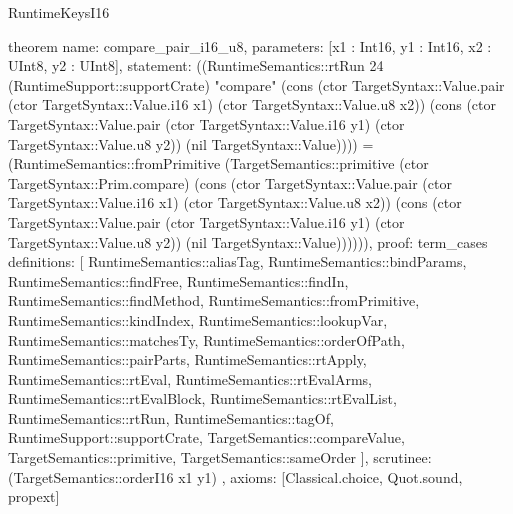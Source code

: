 \begin{lexlean}{RuntimeKeysI16}
\begin{semanticmodule}
theorem{
  name: compare_pair_i16_u8,
  parameters: [x1 : Int16, y1 : Int16, x2 : UInt8, y2 : UInt8],
  statement: ((RuntimeSemantics::rtRun 24 (RuntimeSupport::supportCrate) "compare" (cons (ctor TargetSyntax::Value.pair (ctor TargetSyntax::Value.i16 x1) (ctor TargetSyntax::Value.u8 x2)) (cons (ctor TargetSyntax::Value.pair (ctor TargetSyntax::Value.i16 y1) (ctor TargetSyntax::Value.u8 y2)) (nil TargetSyntax::Value)))) = (RuntimeSemantics::fromPrimitive (TargetSemantics::primitive (ctor TargetSyntax::Prim.compare) (cons (ctor TargetSyntax::Value.pair (ctor TargetSyntax::Value.i16 x1) (ctor TargetSyntax::Value.u8 x2)) (cons (ctor TargetSyntax::Value.pair (ctor TargetSyntax::Value.i16 y1) (ctor TargetSyntax::Value.u8 y2)) (nil TargetSyntax::Value)))))),
  proof: term_cases{
    definitions: [
      RuntimeSemantics::aliasTag,
      RuntimeSemantics::bindParams,
      RuntimeSemantics::findFree,
      RuntimeSemantics::findIn,
      RuntimeSemantics::findMethod,
      RuntimeSemantics::fromPrimitive,
      RuntimeSemantics::kindIndex,
      RuntimeSemantics::lookupVar,
      RuntimeSemantics::matchesTy,
      RuntimeSemantics::orderOfPath,
      RuntimeSemantics::pairParts,
      RuntimeSemantics::rtApply,
      RuntimeSemantics::rtEval,
      RuntimeSemantics::rtEvalArms,
      RuntimeSemantics::rtEvalBlock,
      RuntimeSemantics::rtEvalList,
      RuntimeSemantics::rtRun,
      RuntimeSemantics::tagOf,
      RuntimeSupport::supportCrate,
      TargetSemantics::compareValue,
      TargetSemantics::primitive,
      TargetSemantics::sameOrder
    ],
    scrutinee: (TargetSemantics::orderI16 x1 y1)
  },
  axioms: [Classical.choice, Quot.sound, propext]
}


\end{semanticmodule}
\end{lexlean}

